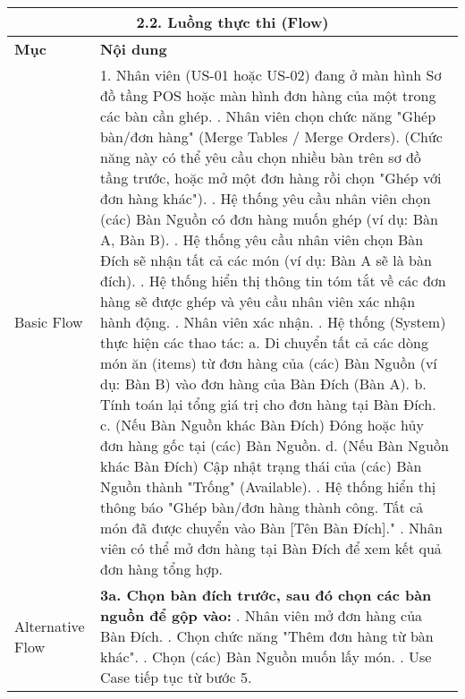 \begin{longtable}{|m{4cm}|p{11cm}|}
\hline
\multicolumn{2}{|c|}{\textbf{2.2. Luồng thực thi (Flow)}} \\
\hline
\textbf{Mục} & \textbf{Nội dung} \\
\hline
Basic Flow & 1. Nhân viên (US-01 hoặc US-02) đang ở màn hình Sơ đồ tầng POS hoặc màn hình đơn hàng của một trong các bàn cần ghép. \newline 2. Nhân viên chọn chức năng "Ghép bàn/đơn hàng" (Merge Tables / Merge Orders). (Chức năng này có thể yêu cầu chọn nhiều bàn trên sơ đồ tầng trước, hoặc mở một đơn hàng rồi chọn "Ghép với đơn hàng khác"). \newline 3. Hệ thống yêu cầu nhân viên chọn (các) Bàn Nguồn có đơn hàng muốn ghép (ví dụ: Bàn A, Bàn B). \newline 4. Hệ thống yêu cầu nhân viên chọn Bàn Đích sẽ nhận tất cả các món (ví dụ: Bàn A sẽ là bàn đích). \newline 5. Hệ thống hiển thị thông tin tóm tắt về các đơn hàng sẽ được ghép và yêu cầu nhân viên xác nhận hành động. \newline 6. Nhân viên xác nhận. \newline 7. Hệ thống (System) thực hiện các thao tác: \newline    a. Di chuyển tất cả các dòng món ăn (items) từ đơn hàng của (các) Bàn Nguồn (ví dụ: Bàn B) vào đơn hàng của Bàn Đích (Bàn A). \newline    b. Tính toán lại tổng giá trị cho đơn hàng tại Bàn Đích. \newline    c. (Nếu Bàn Nguồn khác Bàn Đích) Đóng hoặc hủy đơn hàng gốc tại (các) Bàn Nguồn. \newline    d. (Nếu Bàn Nguồn khác Bàn Đích) Cập nhật trạng thái của (các) Bàn Nguồn thành "Trống" (Available). \newline 8. Hệ thống hiển thị thông báo "Ghép bàn/đơn hàng thành công. Tất cả món đã được chuyển vào Bàn [Tên Bàn Đích]." \newline 9. Nhân viên có thể mở đơn hàng tại Bàn Đích để xem kết quả đơn hàng tổng hợp. \\
\hline
Alternative Flow & \textbf{3a. Chọn bàn đích trước, sau đó chọn các bàn nguồn để gộp vào:} \newline    1. Nhân viên mở đơn hàng của Bàn Đích. \newline    2. Chọn chức năng "Thêm đơn hàng từ bàn khác". \newline    3. Chọn (các) Bàn Nguồn muốn lấy món. \newline    4. Use Case tiếp tục từ bước 5. \\

\end{longtable}
